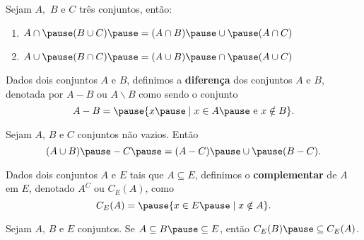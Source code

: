 \documentclass{beamer}
\begin{document}
    \begin{frame}
        \begin{proposicao} Sejam $A,$ $B$ e $C$ tr{\^e}s conjuntos, \pause ent{\~a}o:\pause
            \begin{enumerate}[label={\roman*})]
                \item $A \cap \pause ( B \cup C) \pause = (A \cap B) \pause \cup \pause (A \cap C)$\pause
                \item $A \cup \pause (B \cap C) \pause = (A \cup B) \pause \cap \pause (A \cup C)$\pause
            \end{enumerate}
        \end{proposicao}
    \end{frame}

    \begin{frame}
        \begin{definicao}
            Dados dois conjuntos $A$ e $B$, \pause definimos a \textbf{diferen{\c c}a} \pause dos conjuntos $A$ e $B$, denotada por \pause $A - B$ ou $A \backslash B$ \pause como sendo o conjunto\pause
            \[
                A - B = \pause \{x \pause \mid x \in A \pause \mbox{ e } x \notin B\}.
            \]
        \end{definicao}

    \end{frame}

    \begin{frame}
        \begin{proposicao}
            Sejam $A$, $B$ e $C$ \pause conjuntos n\~ao vazios. Ent\~ao\pause
            \[
                (A \cup B) \pause - C \pause = (A - C) \pause \cup \pause (B - C).
            \]
        \end{proposicao}
    \end{frame}

    \begin{frame}
        \begin{definicao}
        Dados dois conjuntos $A$ e $E$ \pause tais que $A\subseteq E$, \pause definimos o \textbf{complementar} \pause de $A$ em $E$, denotado $A^C$ ou $C_E(A)$, como\pause
        \[
            C_E(A) = \pause \{ x \in E \pause \mid x \notin A \}.
        \]
        \end{definicao}
    \end{frame}

    \begin{frame}
        \begin{proposicao}
            Sejam $A$, $B$ e $E$ conjuntos. \pause Se $A\subseteq B \pause \subseteq E$, \pause ent{\~a}o $C_E(B) \pause \subseteq C_E(A)$.
        \end{proposicao}
    \end{frame}
\end{document}
